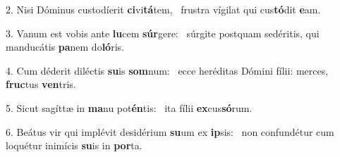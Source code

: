 2. Nisi Dóminus custodíerit \textbf{ci}vi\textbf{tá}tem, \ast\  frustra vígilat qui cus\textbf{tó}dit \textbf{e}am.\

3. Vanum est vobis ante \textbf{lu}cem \textbf{súr}gere: \ast\  súrgite postquam sedéritis, qui manducátis \textbf{pa}nem do\textbf{ló}ris.\

4. Cum déderit diléctis \textbf{su}is \textbf{som}num: \ast\  ecce heréditas Dómini fílii: merces, \textbf{fruc}tus \textbf{ven}tris.\

5. Sicut sagíttæ in \textbf{ma}nu pot\textbf{én}tis: \ast\  ita fílii \textbf{ex}cus\textbf{só}rum.\

6. Beátus vir qui implévit desidérium \textbf{su}um ex \textbf{ip}sis: \ast\  non confundétur cum loquétur inimícis \textbf{su}is in \textbf{por}ta.\

